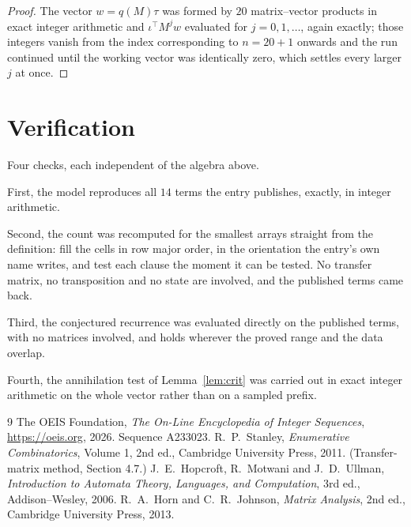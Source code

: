 \documentclass[11pt,a4paper]{article}
\theoremstyle{plain}
\theoremstyle{definition}
\begin{document}
\begin{proof}
The vector $w=q(M)\tau$ was formed by $20$ matrix--vector products in exact integer
arithmetic and $\iota^{\!\top}M^{j}w$ evaluated for $j=0,1,\dots$, again exactly; those
integers vanish from the index corresponding to $n=20+1$ onwards and the run continued
until the working vector was identically zero, which settles every larger $j$ at once.
\end{proof}

\section{Verification}

Four checks, each independent of the algebra above.

First, the model reproduces all $14$ terms the entry publishes, exactly, in integer
arithmetic.

Second, the count was recomputed for the smallest arrays straight from the definition: fill the
cells in row major order, in the orientation the entry's own name writes, and test each clause
the moment it can be tested. No transfer matrix, no transposition and no state are involved,
and the published terms came back.

Third, the conjectured recurrence was evaluated directly on the published terms, with no
matrices involved, and holds wherever the proved range and the data overlap.

Fourth, the annihilation test of Lemma~\ref{lem:crit} was carried out in exact integer
arithmetic on the whole vector rather than on a sampled prefix.

\begin{thebibliography}{9}
 The OEIS Foundation, \emph{The On-Line Encyclopedia of Integer
Sequences}, \url{https://oeis.org}, 2026. Sequence A233023.
 R.~P.~Stanley, \emph{Enumerative Combinatorics}, Volume 1, 2nd ed.,
Cambridge University Press, 2011. (Transfer-matrix method, Section 4.7.)
 J.~E.~Hopcroft, R.~Motwani and J.~D.~Ullman, \emph{Introduction to Automata
Theory, Languages, and Computation}, 3rd ed., Addison--Wesley, 2006.
 R.~A.~Horn and C.~R.~Johnson, \emph{Matrix Analysis}, 2nd ed., Cambridge
University Press, 2013.
\end{thebibliography}
\end{document}
